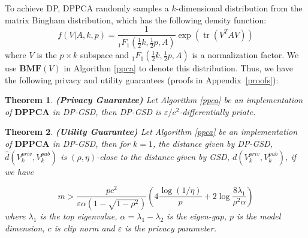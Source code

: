 \documentclass[11pt]{article}
\renewcommand{\epsilon}{\varepsilon}
\newtheorem{theorem}{Theorem}
\begin{document}
To achieve DP, DPPCA randomly samples a $k$-dimensional distribution from the matrix Bingham distribution, which has the following density function:
\begin{equation}
    f(V | A, k, p)=\frac{1}{{ }_1 F_1\left(\frac{1}{2} k, \frac{1}{2} p, A\right)} \exp \left(\operatorname{tr}\left(V^T A V\right)\right)
\end{equation}
where $V$ is the $p \times k$ subspace and ${ }_1 F_1\left(\frac{1}{2} k, \frac{1}{2} p, A\right)$ is a normalization factor. We use $\mathbf{BMF}(V)$ in Algorithm \ref{ppca} to denote this distribution. Thus, we have the following privacy and utility guarantees (proofs in Appendix~\ref{proofs}):

\begin{theorem}
    \textbf{(Privacy Guarantee)} Let Algorithm \ref{ppca} be an implementation of $\mathbf{DPPCA}$ in DP-GSD, then DP-GSD is $\epsilon/c^2$-differentially priate.
    \label{privacy}
\end{theorem}

\begin{theorem}
    \textbf{(Utility Guarantee)} Let Algorithm \ref{ppca} be an implementation of $\mathbf{DPPCA}$ in DP-GSD, then for $k = 1$, the distance given by DP-GSD, $\hat{d}(V^{priv}_k, V^{pub}_k)$ is $(\rho, \eta)$-close to the distance given by GSD, $d(V^{priv}_k, V^{pub}_k)$, if we have

    \begin{equation}
        m>\frac{pc^2}{\epsilon \alpha(1-\sqrt{1 - \rho ^ 2})}\left(4 \frac{\log (1 / \eta)}{p}+2 \log \frac{8 \lambda_1}{\rho^2 \alpha}\right)
    \end{equation}
    where $\lambda_1$ is the top eigenvalue, $\alpha = \lambda_1 - \lambda_2$ is the eigen-gap, $p$ is the model dimension, $c$ is clip norm and $\epsilon$ is the privacy parameter.
    \label{utility}
\end{theorem}


\end{document}
